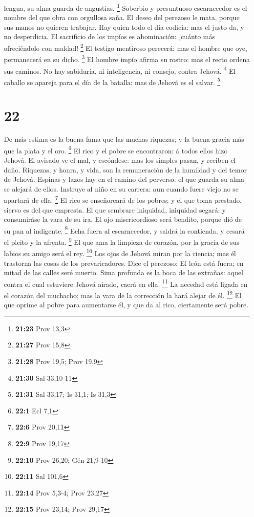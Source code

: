 lengua, su alma guarda de angustias. \footnote{\textbf{21:23} Prov 13,3}
 Soberbio y presuntuoso escarnecedor es el nombre del que
obra con orgullosa saña.  El deseo del perezoso le mata,
porque sus manos no quieren trabajar.  Hay quien todo el
día codicia: mas el justo da, y no desperdicia.  El
sacrificio de los impíos es abominación: ¡cuánto más ofreciéndolo con
maldad! \footnote{\textbf{21:27} Prov 15,8}  El testigo
mentiroso perecerá: mas el hombre que oye, permanecerá en su dicho.
\footnote{\textbf{21:28} Prov 19,5; Prov 19,9}  El hombre
impío afirma su rostro: mas el recto ordena sus caminos. 
No hay sabiduría, ni inteligencia, ni consejo, contra Jehová.
\footnote{\textbf{21:30} Sal 33,10-11}  El caballo se
apareja para el día de la batalla: mas de Jehová es el salvar.
\footnote{\textbf{21:31} Sal 33,17; Is 31,1; Is 31,3}

\hypertarget{section-21}{%
\section{22}\label{section-21}}

 De más estima es la buena fama que las muchas riquezas; y
la buena gracia más que la plata y el oro. \footnote{\textbf{22:1} Ecl
  7,1}  El rico y el pobre se encontraron: á todos ellos
hizo Jehová.  El avisado ve el mal, y escóndese: mas los
simples pasan, y reciben el daño.  Riquezas, y honra, y
vida, son la remuneración de la humildad y del temor de Jehová.
 Espinas y lazos hay en el camino del perverso: el que
guarda su alma se alejará de ellos.  Instruye al niño en
su carrera: aun cuando fuere viejo no se apartará de ella. \footnote{\textbf{22:6}
  Prov 20,11}  El rico se enseñoreará de los pobres; y el
que toma prestado, siervo es del que empresta.  El que
sembrare iniquidad, iniquidad segará: y consumiráse la vara de su ira.
 El ojo misericordioso será bendito, porque dió de su pan
al indigente. \footnote{\textbf{22:9} Prov 19,17}  Echa
fuera al escarnecedor, y saldrá la contienda, y cesará el pleito y la
afrenta. \footnote{\textbf{22:10} Prov 26,20; Gén 21,9-10}
 El que ama la limpieza de corazón, por la gracia de sus
labios su amigo será el rey. \footnote{\textbf{22:11} Sal 101,6}
 Los ojos de Jehová miran por la ciencia; mas él
trastorna las cosas de los prevaricadores.  Dice el
perezoso: El león está fuera; en mitad de las calles seré muerto.
 Sima profunda es la boca de las extrañas: aquel contra
el cual estuviere Jehová airado, caerá en ella. \footnote{\textbf{22:14}
  Prov 5,3-4; Prov 23,27}  La necedad está ligada en el
corazón del muchacho; mas la vara de la corrección la hará alejar de él.
\footnote{\textbf{22:15} Prov 23,14; Prov 29,17}  El que
oprime al pobre para aumentarse él, y que da al rico, ciertamente será
pobre.

